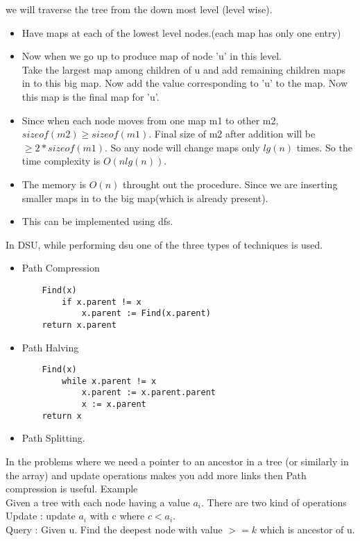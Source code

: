\documentclass[../Notes.tex]{subfiles}
\begin{document}
we will traverse the tree from the down most level (level wise).

\begin{itemize}
	\item Have maps at each of the lowest level nodes.(each map has only one entry)
	\item Now when we go up to produce map of node 'u' in this level.\\
	Take the largest map among children of u and add remaining children maps in to this big map. Now add the value corresponding to 'u' to the map. Now this map is the final map for 'u'.
	\item Since when each node moves from one map m1 to other m2, $sizeof(m2) \geq sizeof(m1)$. Final size of m2 after addition will be $\geq 2*sizeof(m1)$. So any node will change maps only $lg(n)$ times. So the time complexity is $O(nlg(n))$.
	\item The memory is $O(n)$ throught out the procedure. Since we are inserting smaller maps in to the big map(which is already present).
	\item This can be implemented using dfs.
\end{itemize}

In DSU, while performing dsu one of the three types of techniques is used.
\begin{itemize}
	\item Path Compression \\
	\begin{lstlisting}
	Find(x)
    	if x.parent != x
     		x.parent := Find(x.parent)
	return x.parent
   	\end{lstlisting}
   	
   	\item Path Halving \\
   	\begin{lstlisting}
   	Find(x)
   		while x.parent != x
     		x.parent := x.parent.parent
     		x := x.parent
   	return x
   \end{lstlisting}
   
   \item Path Splitting.
\end{itemize}
In the problems where we need a pointer to an ancestor in a tree (or similarly in the array) and update operations makes you add more links then Path compression is useful. Example \\

Given a tree with each node having a value $a_{i}$. There are two kind of operations\\
Update : update $a_{i}$ with c where $c<a_{i}$.\\
Query : Given u. Find the deepest node with value $>= k$ which is ancestor of u.
\end{document}
